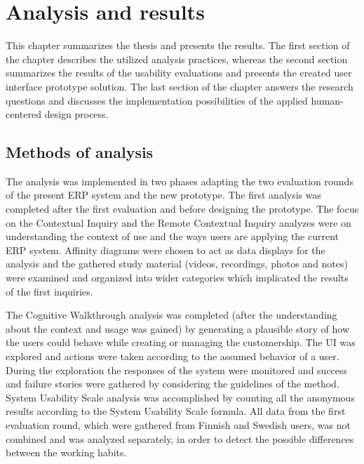 \documentclass[12pt,a4paper,oneside,pdftex]{report}
\begin{document}
\chapter{Analysis and results}
\label{chapter:analysis}

This chapter summarizes the thesis and presents the results. The first section of the chapter describes the utilized analysis practices, whereas the second section summarizes the results of the usability evaluations and presents the created user interface prototype solution. The last section of the chapter answers the research questions and discusses the implementation possibilities of the applied human-centered design process. 

\section{Methods of analysis}
\label{sec:analysismethods}
The analysis was implemented in two phases adapting the two evaluation rounds of the present ERP system and the new prototype. The first analysis was completed after the first evaluation and before designing the prototype. The focus on the Contextual Inquiry and the Remote Contextual Inquiry analyzes were on understanding the context of use and the ways users are applying the current ERP system. Affinity diagrams were chosen to act as data displays for the analysis and the gathered study material (videos, recordings, photos and notes) were examined and organized into wider categories which implicated the results of the first inquiries. 

The Cognitive Walkthrough analysis was completed (after the understanding about the context and usage was gained) by generating a plausible story of how the users could behave while creating or managing the customership. The UI was explored and actions were taken according to the assumed behavior of a user. During the exploration the responses of the system were monitored and success and failure stories were gathered by considering the guidelines of the method. System Usability Scale analysis was accomplished by counting all the anonymous results according to the System Usability Scale formula. All data from the first evaluation round, which were gathered from Finnish and Swedish users, was not combined and was analyzed separately, in order to detect the possible differences between the working habits.
\end{document}

